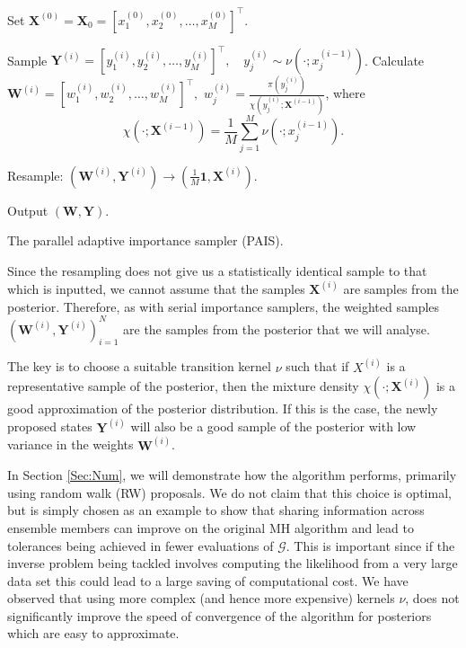 \documentclass[final]{siamltex}
\newcommand{\G}{\mathcal{G}}
\newcommand{\X}{{\mathbf X}}
\newcommand{\Y}{{\mathbf Y}}
\newcommand{\W}{{\mathbf W}}
\begin{document}
\begin{table}[!ht]
\centering
\begin{algorithm}[H]
\DontPrintSemicolon
\BlankLine
	Set $\X^{(0)} = \X_0 = [x_1^{(0)},x_2^{(0)},\ldots,x_M^{(0)}]^\top$.\;
	{
		Sample $\Y^{(i)} = [y_1^{(i)},y_2^{(i)},\ldots,y_M^{(i)}]^\top, \quad y_j^{(i)} \sim
\nu(\cdot;x_j^{(i-1)})$.\label{algline:PAIS_propose}\;
		Calculate $\W^{(i)} = [w_1^{(i)},w_2^{(i)},\ldots,w_M^{(i)}]^\top,$ \quad $w^{(i)}_j =
\frac{\pi(y_j^{(i)})}{\chi(y_j^{(i)};\X^{(i-1)})}$, where
		\[
			\chi(\cdot;\X^{(i-1)}) = \frac{1}{M}\sum_{j=1}^M \nu(\cdot;x_j^{(i-1)}).
		\]

		Resample: $(\W^{(i)},\Y^{(i)}) \rightarrow (\frac{1}{M}\mathbf{1}, \X^{(i)})$.\label{algline:PAIS_resample}\;
	}
	Output $(\W, \Y)$.\;
\caption{The parallel adaptive importance sampler (PAIS).\label{alg:PAIS}}
\end{algorithm}
\end{table}

Since the resampling does not give us a statistically identical sample
to that which is inputted, we cannot assume that the samples $\X^{(i)}$
are samples from the posterior. Therefore, as with serial
importance samplers, the weighted samples
$(\W^{(i)},\Y^{(i)})_{i=1}^N$ are the samples from the posterior that
we will analyse.

The key is to choose a suitable transition kernel $\nu$ such that
if $X^{(i)}$ is a representative sample of the posterior,
then the mixture density $\chi(\cdot;\X^{(i)})$ is a good
approximation of the posterior distribution. If this is the case,
the newly proposed states $\Y^{(i)}$ will also be a good sample of the
posterior with low variance in the weights $\W^{(i)}$.

In Section \ref{Sec:Num}, we will demonstrate how the algorithm
performs, primarily using random walk (RW) proposals. We do not claim that this choice is optimal, but
is simply chosen as an example to show that sharing information across
ensemble members can improve on the original MH algorithm and lead to
tolerances being achieved in fewer evaluations of $\G$. This is important since if
the inverse problem being tackled involves computing
the likelihood from a very large data set this could lead to a
large saving of computational cost. We have observed that
using more complex (and hence more expensive) kernels $\nu$, does not
significantly improve the speed of convergence of the algorithm for
posteriors which are easy to approximate\cite{Paul}.
\end{document}
